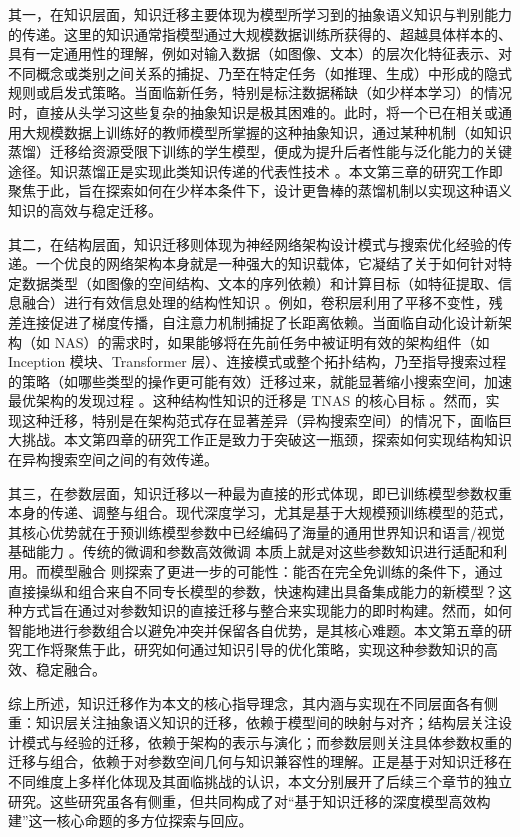 \documentclass[../main.tex]{subfiles}
\begin{document}
其一，在知识层面，知识迁移主要体现为模型所学习到的抽象语义知识与判别能力的传递。这里的知识通常指模型通过大规模数据训练所获得的、超越具体样本的、具有一定通用性的理解，例如对输入数据（如图像、文本）的层次化特征表示、对不同概念或类别之间关系的捕捉、乃至在特定任务（如推理、生成）中形成的隐式规则或启发式策略。当面临新任务，特别是标注数据稀缺（如少样本学习）的情况时，直接从头学习这些复杂的抽象知识是极其困难的。此时，将一个已在相关或通用大规模数据上训练好的教师模型所掌握的这种抽象知识，通过某种机制（如知识蒸馏）迁移给资源受限下训练的学生模型，便成为提升后者性能与泛化能力的关键途径。知识蒸馏正是实现此类知识传递的代表性技术 。本文第三章的研究工作即聚焦于此，旨在探索如何在少样本条件下，设计更鲁棒的蒸馏机制以实现这种语义知识的高效与稳定迁移。

其二，在结构层面，知识迁移则体现为神经网络架构设计模式与搜索优化经验的传递。一个优良的网络架构本身就是一种强大的知识载体，它凝结了关于如何针对特定数据类型（如图像的空间结构、文本的序列依赖）和计算目标（如特征提取、信息融合）进行有效信息处理的结构性知识 。例如，卷积层利用了平移不变性，残差连接促进了梯度传播，自注意力机制捕捉了长距离依赖。当面临自动化设计新架构（如 NAS）的需求时，如果能够将在先前任务中被证明有效的架构组件（如 Inception 模块、Transformer 层）、连接模式或整个拓扑结构，乃至指导搜索过程的策略（如哪些类型的操作更可能有效）迁移过来，就能显著缩小搜索空间，加速最优架构的发现过程 。这种结构性知识的迁移是 TNAS 的核心目标 。然而，实现这种迁移，特别是在架构范式存在显著差异（异构搜索空间）的情况下，面临巨大挑战。本文第四章的研究工作正是致力于突破这一瓶颈，探索如何实现结构知识在异构搜索空间之间的有效传递。

其三，在参数层面，知识迁移以一种最为直接的形式体现，即已训练模型参数权重本身的传递、调整与组合。现代深度学习，尤其是基于大规模预训练模型的范式，其核心优势就在于预训练模型参数中已经编码了海量的通用世界知识和语言/视觉基础能力 。传统的微调和参数高效微调 本质上就是对这些参数知识进行适配和利用。而模型融合  则探索了更进一步的可能性：能否在完全免训练的条件下，通过直接操纵和组合来自不同专长模型的参数，快速构建出具备集成能力的新模型？这种方式旨在通过对参数知识的直接迁移与整合来实现能力的即时构建。然而，如何智能地进行参数组合以避免冲突并保留各自优势，是其核心难题。本文第五章的研究工作将聚焦于此，研究如何通过知识引导的优化策略，实现这种参数知识的高效、稳定融合。

综上所述，知识迁移作为本文的核心指导理念，其内涵与实现在不同层面各有侧重：知识层关注抽象语义知识的迁移，依赖于模型间的映射与对齐；结构层关注设计模式与经验的迁移，依赖于架构的表示与演化；而参数层则关注具体参数权重的迁移与组合，依赖于对参数空间几何与知识兼容性的理解。正是基于对知识迁移在不同维度上多样化体现及其面临挑战的认识，本文分别展开了后续三个章节的独立研究。这些研究虽各有侧重，但共同构成了对“基于知识迁移的深度模型高效构建”这一核心命题的多方位探索与回应。
\end{document}
